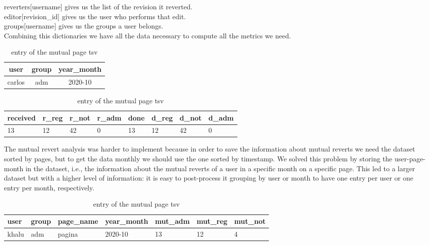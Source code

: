 reverters[username] gives us the list of the revision it reverted. \\
\indent editor[revision\_id] gives us the user who performs that edit. \\
\indent groups[username] gives us the groups a user belongs.\\

Combining this dictionaries we have all the data necessary to compute all the metrics we need.
\begin{table}[H]
    \centering
    \begin{tabularx}{\columnwidth}{@{}ccc@{}}
        \midrule
        \textbf{user} & \textbf{group} & \textbf{year\_month} \\ \toprule
        carlos & adm & 2020-10  \\
        
         \bottomrule
    \end{tabularx}
    \begin{tabularx}{\columnwidth}{@{}XXXXXXXX@{}}
        \midrule
        \textbf{received} & \textbf{r\_reg}  & \textbf{r\_not} & \textbf{r\_adm} & \textbf{done} & \textbf{d\_reg} & \textbf{d\_not} & \textbf{d\_adm}\\ \toprule
        13 & 12 & 42  & 0 & 13 & 12 & 42  & 0  \\
        
         \bottomrule
    \end{tabularx}
    
    \caption{entry of the mutual page tsv \label{table:revks}}
\end{table}


The mutual revert analysis was harder to implement because in order to save the information about
mutual reverts we need the dataset sorted by pages, but to get the data monthly we should use the
one sorted by timestamp. We solved this problem by storing the user-page-month in the dataset, i.e.,
the information about the mutual reverts of a user in a specific month on a specific page.
This led to a larger dataset but with a higher level of information: it is easy to post-process it
grouping by user or month to have one entry per user or one entry per month, respectively. 


\begin{table}[H]
    \centering
    \begin{tabularx}{\columnwidth}{@{}XXXXXXX@{}}
        \midrule
        \textbf{user} & \textbf{group} & \textbf{page\_name}& \textbf{year\_month} & \textbf{mut\_adm}& \textbf{mut\_reg}& \textbf{mut\_not}\\ \toprule
        khalu & adm & pagina & 2020-10 & 13 & 12 & 4 \\
        
         \bottomrule
    \end{tabularx}

    
    \caption{entry of the mutual page tsv \label{table:rjevks}}
\end{table}







